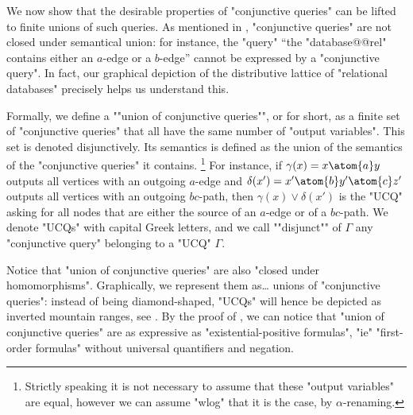 We now show that the desirable properties of "conjunctive queries" can be
lifted to finite unions of such queries.
As mentioned in , "conjunctive queries"
are not closed under semantical union: for instance,
the "query" ``the "database@@rel" contains either an $a$-edge or a $b$-edge''
cannot be expressed by a "conjunctive query".
In fact, our graphical depiction of the distributive lattice of "relational databases"
precisely helps us understand this.

Formally, we define a ""union of conjunctive queries"", or  for short,
as a finite set of "conjunctive queries" that all have the same number
of "output variables". This set is denoted disjunctively.
Its semantics is defined as the union of the semantics of the "conjunctive queries" it contains.%
\footnote[][2em]{Strictly speaking it is not necessary
to assume that these "output variables" are equal, however we can assume "wlog" that
it is the case, by $\alpha$-renaming.}
For instance, if $\gamma(x) = x \atom{a} y$ outputs all vertices
with an outgoing $a$-edge and $\delta(x') = x' \atom{b} y' \atom{c} z'$
outputs all vertices with an outgoing $bc$-path, then
$\gamma(x) \lor \delta(x')$ is the "UCQ" asking for all nodes
that are either the source of an $a$-edge or of a $bc$-path.
We denote "UCQs" with capital Greek letters,
and \AP we call ""disjunct"" of $\Gamma$ any "conjunctive query" belonging to a
"UCQ" $\Gamma$.

Notice that "union of conjunctive queries" are also "closed under homomorphisms".
Graphically, we represent them as… unions of "conjunctive queries":
instead of being diamond-shaped, "UCQs" will hence be depicted
as inverted mountain ranges, see .
By the proof of , we can notice that "union of conjunctive queries"
are as expressive as "existential-positive formulas", "ie" "first-order formulas"
without universal quantifiers and negation.

